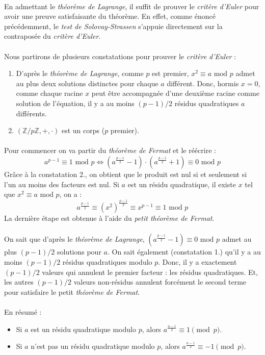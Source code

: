 		\paragraph{}En admettant le \textit{théorème de Lagrange}, il suffit de prouver le \textit{critère d'Euler} pour avoir une preuve satisfaisante du théorème. En effet, comme énoncé précédemment, le \textit{test de Solovay-Strassen} s'appuie directement sur la contraposée du \textit{critère d'Euler}.
		\paragraph{}Nous partirons de plusieurs constatations pour prouver le \textit{critère d'Euler} :
		\begin{enumerate}
		\item D'après le \textit{théorème de Lagrange}, comme $p$ est premier, $x^{2} \equiv a \text{ mod } p$ admet au plus deux solutions distinctes pour chaque $a$ différent. Donc, hormis $x = 0$, comme chaque racine $x$ peut être accompagnée d'une deuxième racine comme solution de l'équation, il y a au moins $(p - 1)/2$ résidus quadratiques $a$ différents. 
		\item $(\mathbb{Z}/p\mathbb{Z}, +, \cdot)$ est un corps ($p$ premier).
		\end{enumerate}
		
		\paragraph{}Pour commencer on va partir du \textit{théorème de Fermat} et le réécrire :
		\[a^{p-1} \equiv 1 \text{ mod } p \iff (a^{\frac{p-1}{2}} - 1) \cdot (a^{\frac{p-1}{2}} + 1) \equiv 0 \text{ mod } p\]
		Grâce à la constatation 2., on obtient que le produit est nul si et seulement si l'un au moins des facteurs est nul. Si $a$ est un résidu quadratique, il existe $x$ tel que $x^{2} \equiv a \text{ mod } p$, on a :
		\[
			a^{\frac{p-1}{2}} \equiv (x^{2})^{\frac{p-1}{2}} \equiv x^{p-1} \equiv 1 \text{ mod } p
		\]
		La dernière étape est obtenue à l'aide du \textit{petit théorème de Fermat}.
		
		\paragraph{}On sait que d'après le \textit{théorème de Lagrange}, $(a^{\frac{p-1}{2}} - 1) \equiv 0 \text{ mod } p$ admet au plus $(p-1)/2$ solutions pour $a$. On sait également (constatation 1.) qu'il y a au moins $(p-1)/2$ résidus quadratiques modulo $p$. Donc, il y a exactement $(p-1)/2$ valeurs qui annulent le premier facteur : les résidus quadratiques. Et, les autres $(p-1)/2$ valeurs non-résidus annulent forcément le second terme pour satisfaire le petit \textit{théorème de Fermat}.
		
		\paragraph{}\noindent En résumé :
			\begin{itemize}
				\item Si $a$ est un résidu quadratique modulo $p$, alors $a^{\frac{n-1}{2}} \equiv 1 \pmod p$.
				\item Si $a$ n'est pas un résidu quadratique modulo $p$, alors $a^{\frac{n-1}{2}} \equiv -1 \pmod p$.
			\end{itemize}
